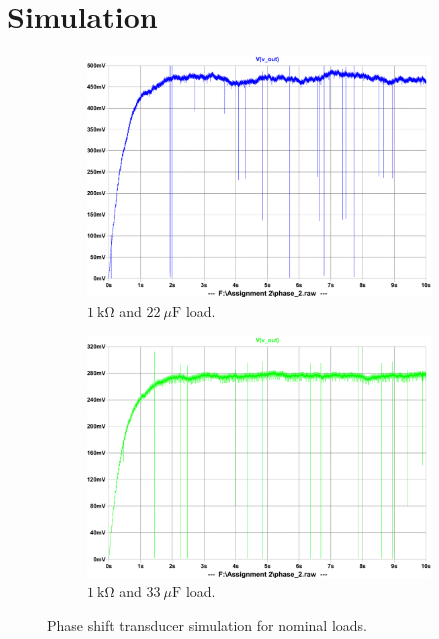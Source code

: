 \section{Simulation} \label{sec:simulation_phase}

\begin{figure}[h] 
 \centering
 
    \begin{subfigure}[]{0.65\linewidth}
        \centering
        \includegraphics[width=1.\linewidth]{./Figures/phase_transducer_simulation_22u.pdf}
        \caption{$\SI{1}{\kilo\ohm}$ and $\SI{22}{\mu\farad}$ load.}
        \label{fig:phase_simulation_22u}
    \end{subfigure}
    \begin{subfigure}[]{0.65\linewidth}
        \centering
        \includegraphics[width=1.\linewidth]{./Figures/phase_transducer_simulation_33u.pdf}
        \caption{$\SI{1}{\kilo\ohm}$ and $\SI{33}{\mu\farad}$ load.}
	    \label{fig:phase_simulation_33u}
    \end{subfigure}
    
\caption{Phase shift transducer simulation for nominal loads.}
\end{figure}

